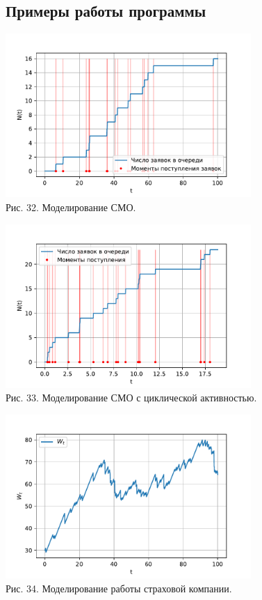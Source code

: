 \documentclass[11pt]{article}
\begin{document}
\subsection{Примеры работы программы}
\begin{center}
	\includegraphics[width=0.7\textwidth]{11_1.pdf}\\
	{Рис. 32. Моделирование СМО. }
\end{center}
\begin{center}
	\includegraphics[width=0.7\textwidth]{11_2.pdf}\\
	{Рис. 33. Моделирование СМО с циклической активностью. }
\end{center}
\begin{center}
	\includegraphics[width=0.7\textwidth]{11_3.pdf}\\
	{Рис. 34. Моделирование работы страховой компании. }
\end{center}
\end{document}
